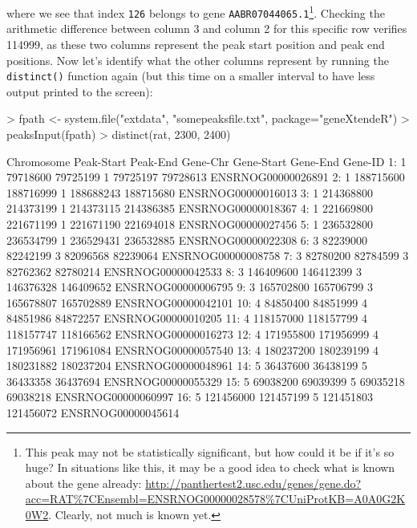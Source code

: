 \documentclass[12pt]{article}
\begin{document}
where we see that index \texttt{126} belongs to gene \texttt{AABR07044065.1}\footnote{This peak may not be statistically significant, but how could it be if it's so huge?  In situations like this, it may be a good idea to check what is known about the gene already: \url{http://panthertest2.usc.edu/genes/gene.do?acc=RAT\%7CEnsembl=ENSRNOG00000028578\%7CUniProtKB=A0A0G2K0W2}.  Clearly, not much is known yet.}.  Checking the arithmetic difference between column 3 and column 2 for this specific row verifies 114999, as these two columns represent the peak start position and peak end positions.  Now let's identify what the other columns represent by running the \texttt{distinct()} function again (but this time on a smaller interval to have less output printed to the screen):    

\begin{Schunk}
\begin{Sinput}
> fpath <- system.file("extdata", "somepeaksfile.txt", package="geneXtendeR")
> peaksInput(fpath)
> distinct(rat, 2300, 2400)
\end{Sinput}
\begin{Soutput}
    Chromosome Peak-Start  Peak-End Gene-Chr Gene-Start  Gene-End            Gene-ID
 1:          1   79718600  79725199        1   79725197  79728613 ENSRNOG00000026891
 2:          1  188715600 188716999        1  188688243 188715680 ENSRNOG00000016013
 3:          1  214368800 214373199        1  214373115 214386385 ENSRNOG00000018367
 4:          1  221669800 221671199        1  221671190 221694018 ENSRNOG00000027456
 5:          1  236532800 236534799        1  236529431 236532885 ENSRNOG00000022308
 6:          3   82239000  82242199        3   82096568  82239064 ENSRNOG00000008758
 7:          3   82780200  82784599        3   82762362  82780214 ENSRNOG00000042533
 8:          3  146409600 146412399        3  146376328 146409652 ENSRNOG00000006795
 9:          3  165702800 165706799        3  165678807 165702889 ENSRNOG00000042101
10:          4   84850400  84851999        4   84851986  84872257 ENSRNOG00000010205
11:          4  118157000 118157799        4  118157747 118166562 ENSRNOG00000016273
12:          4  171955800 171956999        4  171956961 171961084 ENSRNOG00000057540
13:          4  180237200 180239199        4  180231882 180237204 ENSRNOG00000048961
14:          5   36437600  36438199        5   36433358  36437694 ENSRNOG00000055329
15:          5   69038200  69039399        5   69035218  69038218 ENSRNOG00000060997
16:          5  121456000 121457199        5  121451803 121456072 ENSRNOG00000045614

\end{Soutput}
\end{Schunk}
\end{document}
